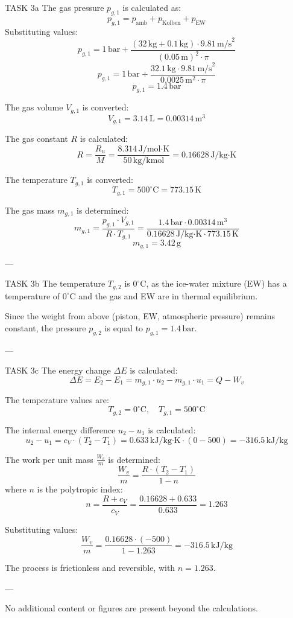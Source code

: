 TASK 3a  
The gas pressure \( p_{g,1} \) is calculated as:  
\[
p_{g,1} = p_{\text{amb}} + p_{\text{Kolben}} + p_{\text{EW}}
\]  
Substituting values:  
\[
p_{g,1} = 1 \, \text{bar} + \frac{(32 \, \text{kg} + 0.1 \, \text{kg}) \cdot 9.81 \, \text{m/s}^2}{(0.05 \, \text{m})^2 \cdot \pi}
\]  
\[
p_{g,1} = 1 \, \text{bar} + \frac{32.1 \, \text{kg} \cdot 9.81 \, \text{m/s}^2}{0.0025 \, \text{m}^2 \cdot \pi}
\]  
\[
p_{g,1} = 1.4 \, \text{bar}
\]  

The gas volume \( V_{g,1} \) is converted:  
\[
V_{g,1} = 3.14 \, \text{L} = 0.00314 \, \text{m}^3
\]  

The gas constant \( R \) is calculated:  
\[
R = \frac{R_u}{M} = \frac{8.314 \, \text{J/mol·K}}{50 \, \text{kg/kmol}} = 0.16628 \, \text{J/kg·K}
\]  

The temperature \( T_{g,1} \) is converted:  
\[
T_{g,1} = 500^\circ\text{C} = 773.15 \, \text{K}
\]  

The gas mass \( m_{g,1} \) is determined:  
\[
m_{g,1} = \frac{p_{g,1} \cdot V_{g,1}}{R \cdot T_{g,1}} = \frac{1.4 \, \text{bar} \cdot 0.00314 \, \text{m}^3}{0.16628 \, \text{J/kg·K} \cdot 773.15 \, \text{K}}
\]  
\[
m_{g,1} = 3.42 \, \text{g}
\]  

---

TASK 3b  
The temperature \( T_{g,2} \) is \( 0^\circ\text{C} \), as the ice-water mixture (EW) has a temperature of \( 0^\circ\text{C} \) and the gas and EW are in thermal equilibrium.  

Since the weight from above (piston, EW, atmospheric pressure) remains constant, the pressure \( p_{g,2} \) is equal to \( p_{g,1} = 1.4 \, \text{bar} \).  

---

TASK 3c  
The energy change \( \Delta E \) is calculated:  
\[
\Delta E = E_2 - E_1 = m_{g,1} \cdot u_2 - m_{g,1} \cdot u_1 = Q - W_v
\]  

The temperature values are:  
\[
T_{g,2} = 0^\circ\text{C}, \quad T_{g,1} = 500^\circ\text{C}
\]  

The internal energy difference \( u_2 - u_1 \) is calculated:  
\[
u_2 - u_1 = c_V \cdot (T_2 - T_1) = 0.633 \, \text{kJ/kg·K} \cdot (0 - 500) = -316.5 \, \text{kJ/kg}
\]  

The work per unit mass \( \frac{W_v}{m} \) is determined:  
\[
\frac{W_v}{m} = \frac{R \cdot (T_2 - T_1)}{1 - n}
\]  
where \( n \) is the polytropic index:  
\[
n = \frac{R + c_V}{c_V} = \frac{0.16628 + 0.633}{0.633} = 1.263
\]  

Substituting values:  
\[
\frac{W_v}{m} = \frac{0.16628 \cdot (-500)}{1 - 1.263} = -316.5 \, \text{kJ/kg}
\]  

The process is frictionless and reversible, with \( n = 1.263 \).  

---

No additional content or figures are present beyond the calculations.